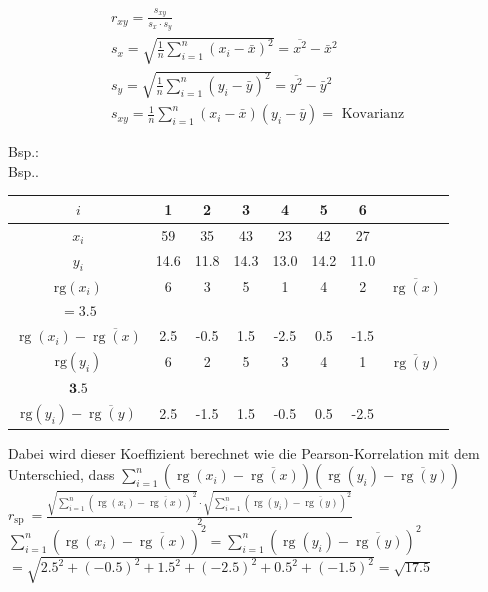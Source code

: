 \documentclass[10pt]{article}
\begin{document}
$$
\begin{gathered}
r_{x y}=\frac{s_{x y}}{s_{x} \cdot s_{y}} \\
s_{x}=\sqrt{\frac{1}{n} \sum_{i=1}^{n}\left(x_{i}-\bar{x}\right)^{2}}=\overline{x^{2}}-\bar{x}^{2} \\
s_{y}=\sqrt{\frac{1}{n} \sum_{i=1}^{n}\left(y_{i}-\bar{y}\right)^{2}}=\overline{y^{2}}-\bar{y}^{2} \\
s_{x y}=\frac{1}{n} \sum_{i=1}^{n}\left(x_{i}-\bar{x}\right)\left(y_{i}-\bar{y}\right)=\text { Kovarianz }
\end{gathered}
$$

Bsp.:\\
Bsp..

\begin{center}
\begin{tabular}{|c|c|c|c|c|c|c|c|}
\hline
$i$ & 1 & 2 & 3 & 4 & 5 & 6 &  \\
\hline
$x_{i}$ & 59 & 35 & 43 & 23 & 42 & 27 &  \\
\hline
$y_{i}$ & 14.6 & 11.8 & 14.3 & 13.0 & 14.2 & 11.0 &  \\
\hline
$\mathrm{rg}\left(x_{i}\right)$ & 6 & 3 & 5 & 1 & 4 & 2 & $\overline{\operatorname{rg}(x)}$ \\
$=3.5$ &  &  &  &  &  &  &  \\
\hline
$\operatorname{rg}\left(x_{i}\right)-\overline{\operatorname{rg}(x)}$ & 2.5 & -0.5 & 1.5 & -2.5 & 0.5 & -1.5 &  \\
\hline
$\mathrm{rg}\left(y_{i}\right)$ & 6 & 2 & 5 & 3 & 4 & 1 & $\overline{\operatorname{rg}(y)}$ \\
\hline
$\mathbf{3} .5$ &  &  &  &  &  &  &  \\
\hline
$\mathrm{rg}\left(y_{i}\right)-\overline{\operatorname{rg}(y)}$ & 2.5 & -1.5 & 1.5 & -0.5 & 0.5 & -2.5 &  \\
\hline
\end{tabular}
\end{center}

Dabei wird dieser Koeffizient berechnet wie die Pearson-Korrelation mit dem Unterschied, dass $\sum_{i=1}^{n}\left(\operatorname{rg}\left(x_{i}\right)-\overline{\operatorname{rg}(x)}\right)\left(\operatorname{rg}\left(y_{i}\right)-\overline{\operatorname{rg}(y)}\right)$\\
$r_{\text {sp }}=\frac{\sqrt{\sum_{i=1}^{n}\left(\operatorname{rg}\left(x_{i}\right)-\overline{\operatorname{rg}(x)}\right)^{2}} \cdot \sqrt{\sum_{i=1}^{n}\left(\operatorname{rg}\left(y_{i}\right)-\overline{\operatorname{rg}(y)}\right)^{2}}}{2}$\\
$\sum_{i=1}^{n}\left(\operatorname{rg}\left(x_{i}\right)-\overline{\operatorname{rg}(x)}\right)^{2}=\sum_{i=1}^{n}\left(\operatorname{rg}\left(y_{i}\right)-\overline{\operatorname{rg}(y)}\right)^{2}$\\
$=\sqrt{2.5^{2}+(-0.5)^{2}+1.5^{2}+(-2.5)^{2}+0.5^{2}+(-1.5)^{2}}=\sqrt{17.5}$
\end{document}
